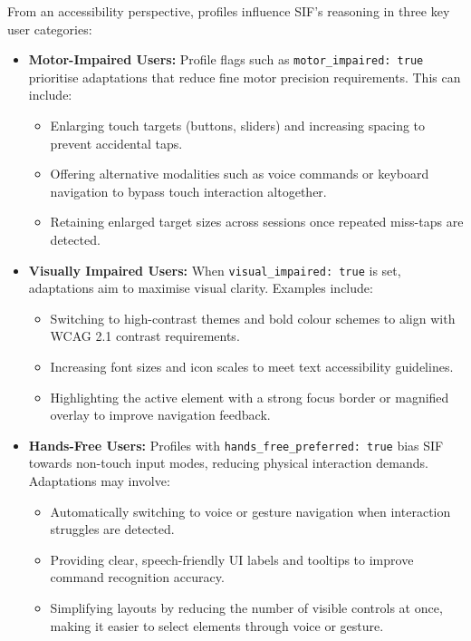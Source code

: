 From an accessibility perspective, profiles influence SIF’s reasoning in three key user categories:
\begin{itemize}
    \item \textbf{Motor-Impaired Users:} Profile flags such as \verb|motor_impaired: true| prioritise adaptations that reduce fine motor precision requirements. This can include:
    \begin{itemize}
        \item Enlarging touch targets (buttons, sliders) and increasing spacing to prevent accidental taps.
        \item Offering alternative modalities such as voice commands or keyboard navigation to bypass touch interaction altogether.
        \item Retaining enlarged target sizes across sessions once repeated miss-taps are detected.
    \end{itemize}

    \item \textbf{Visually Impaired Users:} When \verb|visual_impaired: true| is set, adaptations aim to maximise visual clarity. Examples include:
    \begin{itemize}
        \item Switching to high-contrast themes and bold colour schemes to align with WCAG 2.1 contrast requirements.
        \item Increasing font sizes and icon scales to meet text accessibility guidelines.
        \item Highlighting the active element with a strong focus border or magnified overlay to improve navigation feedback.
    \end{itemize}

    \item \textbf{Hands-Free Users:} Profiles with \verb|hands_free_preferred: true| bias SIF towards non-touch input modes, reducing physical interaction demands. Adaptations may involve:
    \begin{itemize}
        \item Automatically switching to voice or gesture navigation when interaction struggles are detected.
        \item Providing clear, speech-friendly UI labels and tooltips to improve command recognition accuracy.
        \item Simplifying layouts by reducing the number of visible controls at once, making it easier to select elements through voice or gesture.
    \end{itemize}
\end{itemize}

